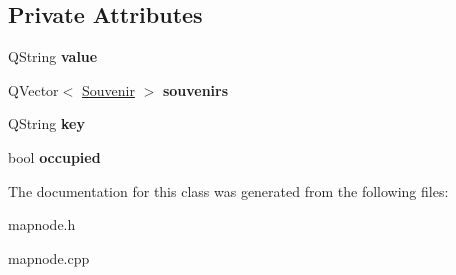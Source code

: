 \subsection*{Private Attributes}
\begin{DoxyCompactItemize}
\item 
\mbox{\label{class_map_node_a96c7b1b1fabcce7d5711f8b02ae01197}} 
Q\+String {\bfseries value}
\item 
\mbox{\label{class_map_node_a1868cacdc70ce21145990e7f76826c7e}} 
Q\+Vector$<$ \hyperlink{class_souvenir}{Souvenir} $>$ {\bfseries souvenirs}
\item 
\mbox{\label{class_map_node_a8b2e1229b3d58503d84758fa0fbb61be}} 
Q\+String {\bfseries key}
\item 
\mbox{\label{class_map_node_aad4e757ae63dce3f8ddccbf9d2892cdd}} 
bool {\bfseries occupied}
\end{DoxyCompactItemize}


The documentation for this class was generated from the following files\+:\begin{DoxyCompactItemize}
\item 
mapnode.\+h\item 
mapnode.\+cpp\end{DoxyCompactItemize}
